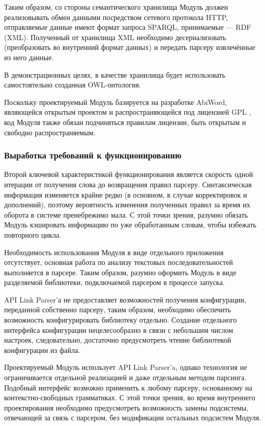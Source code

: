 Таким образом, со стороны семантического хранилища Модуль должен реализовывать обмен данными посредством сетевого протокола HTTP, отправляемые данные имеют формат запроса SPARQL, принимаемые --- RDF (XML). Полученный от хранилища XML необходимо десериализовать (преобразовать во внутренний формат данных) и передать парсеру извлечённые из него данные.

В демонстрационных целях, в качестве хранилища будет использовать самостоятельно созданная OWL-онтология.

Поскольку проектируемый Модуль базируется на разработке AbiWord, являющейся открытым проектом и распространяющейся под лицензией GPL \cite{gpl}, код Модуля также обязан подчиняться правилам лицензии, быть открытым и свободно распространяемым. 

\subsubsection{Выработка требований к функционированию}

Второй ключевой характеристикой функционирования является скорость одной итерации от получения слова до возвращения правил парсеру. Синтаксическая информация изменяется крайне редко (в основном, в случае корректировок и дополнений), поэтому вероятность изменения полученных правил за время их оборота в системе пренебрежимо мала. С этой точки зрения, разумно обязать Модуль кэшировать информацию по уже обработанным словам, чтобы избежать повторного цикла.

Необходимость использования Модуля в виде отдельного приложения отсутствует, основная работа по анализу текстовых последовательностей выполняется в парсере. Таким образом, разумно оформить Модуль в виде разделяемой библиотеки, подключаемой парсером в процессе запуска.

API Link Parser'а не предоставляет возможностей получения конфигурации, переданной собственно парсеру, таким образом, необходимо обеспечить возможность конфигурировать библиотеку отдельно. Создание отдельного интерфейса конфигурации нецелесообразно в связи с небольшим числом настроек, следовательно, достаточно предусмотреть чтение библиотекой конфигурации из файла.

Проектируемый Модуль использует API Link Parser'a, однако технология не ограничивается отдельной реализацией и даже отдельным методом парсинга. Подобный интерфейс возможно применить к любому парсеру, основанному на контекстно-свободных грамматиках. С этой точки зрения, во время внутреннего проектирования необходимо предусмотреть возможность замены подсистемы, отвечающей за связь с парсером, без модификации остальных подсистем Модуля.

